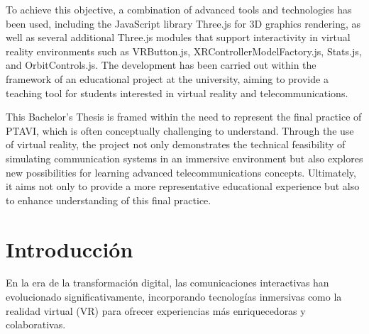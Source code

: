 \documentclass[a4paper, 12pt]{book}
\begin{document}
\bigskip

To achieve this objective, a combination of advanced tools and technologies has been used, including the JavaScript library Three.js for 3D graphics rendering, 
as well as several additional Three.js modules that support interactivity in virtual reality environments such as VRButton.js, XRControllerModelFactory.js, Stats.js, 
and OrbitControls.js. The development has been carried out within the framework of an educational project at the university, aiming to provide a teaching tool 
for students interested in virtual reality and telecommunications.

\bigskip

This Bachelor's Thesis is framed within the need to represent the final practice of PTAVI, which is often conceptually challenging to understand. 
Through the use of virtual reality, the project not only demonstrates the technical feasibility of simulating communication systems in an immersive environment 
but also explores new possibilities for learning advanced telecommunications concepts. Ultimately, it aims not only to provide a more representative educational 
experience but also to enhance understanding of this final practice.




\tableofcontents 
\cleardoublepage
\listoffigures %



\cleardoublepage
\chapter{Introducción}
\label{sec:intro} %
En la era de la transformación digital, las comunicaciones interactivas han evolucionado significativamente, 
incorporando tecnologías inmersivas como la realidad virtual (VR) para ofrecer experiencias más enriquecedoras y colaborativas. 
\end{document}
